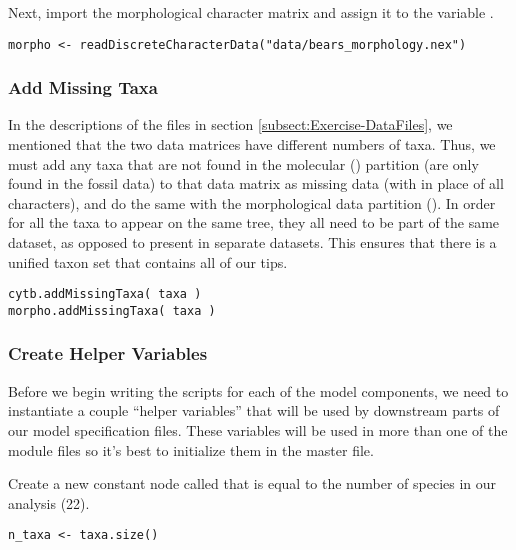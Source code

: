 Next, import the morphological character matrix and assign it to the variable . 
{\tt \begin{snugshade*}
\begin{lstlisting}
morpho <- readDiscreteCharacterData("data/bears_morphology.nex")
\end{lstlisting}
\end{snugshade*}}

 

\medskip
\subsubsection{Add Missing Taxa}\label{subsub:Exercise-AddMissing}

In the descriptions of the files in section \ref{subsect:Exercise-DataFiles}, we mentioned that the two data matrices have different numbers of taxa. 
Thus, we must add any taxa that are not found in the molecular () partition (\IE are only found in the fossil data) to that data matrix as missing data (with  in place of all characters), and do the same with the morphological data partition ().
In order for all the taxa to appear on the same tree, they all need to be part of the same dataset, as opposed to present in separate datasets. 
This ensures that there is a unified taxon set that contains all of our tips.
{\tt \begin{snugshade*}
\begin{lstlisting}
cytb.addMissingTaxa( taxa )
morpho.addMissingTaxa( taxa )
\end{lstlisting}
\end{snugshade*}}


\medskip
\subsubsection{Create Helper Variables}\label{subsub:Exercise-mviVar}

Before we begin writing the \Rev scripts for each of the model components, we need to instantiate a couple ``helper variables'' that will be used by downstream parts of our model specification files. 
These variables will be used in more than one of the module files so it's best to initialize them in the master file.

Create a new constant node called  that is equal to the number of species in our analysis (22). 
{\tt \begin{snugshade*}
\begin{lstlisting}
n_taxa <- taxa.size() 
\end{lstlisting}
\end{snugshade*}}

